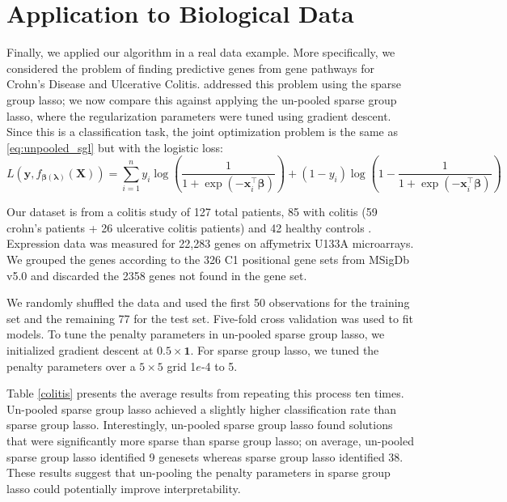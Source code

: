 \documentclass[12pt]{article}
\begin{document}
\section{Application to Biological Data}\label{realDataResults}
Finally, we applied our algorithm in a real data example. More specifically, we considered the problem of finding predictive genes from gene pathways for Crohn's Disease and Ulcerative Colitis. \citet{simon2013sparse} addressed this problem using the sparse group lasso; we now compare this against applying the un-pooled sparse group lasso, where the regularization parameters were tuned using gradient descent. Since this is a classification task, the joint optimization problem is the same as \eqref{eq:unpooled_sgl} but with the logistic loss:
\begin{equation}
L\left ( \boldsymbol{y}, f_{\boldsymbol \beta(\boldsymbol\lambda)}(\boldsymbol{X}) \right ) = \sum_{i=1}^{n} y_{i} \log \left ( \frac{1}{1+\exp(-\boldsymbol x_{i}^\top \boldsymbol \beta)} \right ) + (1- y_i)\log \left (1 - \frac{1}{1+\exp(-\boldsymbol x_i^\top \boldsymbol \beta)} \right)
\end{equation}


Our dataset is from a colitis study of 127 total patients, 85 with colitis (59 crohn's patients + 26 ulcerative colitis patients) and 42 healthy controls \citep{burczynski2006molecular}. Expression data was measured for 22,283 genes on affymetrix U133A microarrays. We grouped the genes according to the 326 C1 positional gene sets from MSigDb v5.0 \citep{subramanian2005gene} and discarded the 2358 genes not found in the gene set.

We randomly shuffled the data and used the first 50 observations for the training set and the remaining 77 for the test set. Five-fold cross validation was used to fit models. To tune the penalty parameters in un-pooled sparse group lasso, we initialized gradient descent at $0.5 \times \boldsymbol 1$. For sparse group lasso, we tuned the penalty parameters over a $5 \times 5$ grid 1$e$-4 to 5.

Table \ref{colitis} presents the average results from repeating this process ten times. Un-pooled sparse group lasso achieved a slightly higher classification rate than sparse group lasso. Interestingly, un-pooled sparse group lasso found solutions that were significantly more sparse than sparse group lasso; on average, un-pooled sparse group lasso identified 9 genesets whereas sparse group lasso identified 38. These results suggest that un-pooling the penalty parameters in sparse group lasso could potentially improve interpretability.
\end{document}
